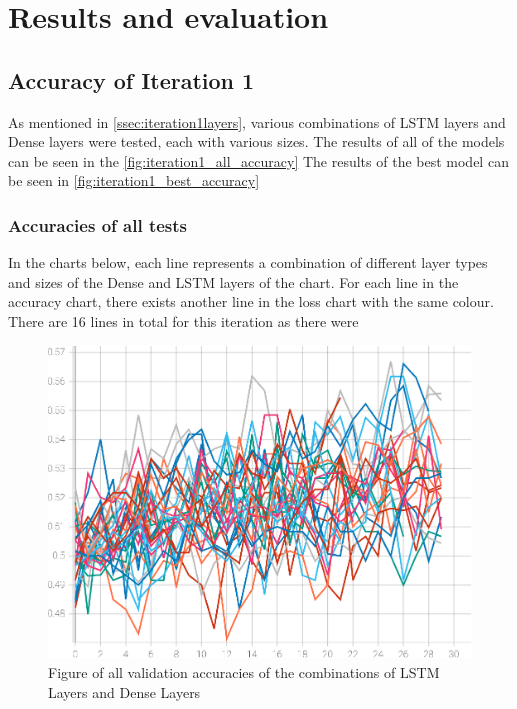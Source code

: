 \chapter{Results and evaluation} \label{chap:results}
\section{Accuracy of Iteration 1}
As mentioned in \autoref{ssec:iteration1layers}, various combinations of LSTM layers and Dense layers were tested,
each with various sizes. The results of all of the models can be seen in the \autoref{fig:iteration1_all_accuracy}
The results of the best model can be seen in \autoref{fig:iteration1_best_accuracy}

\subsection{Accuracies of all tests}
In the charts below, each line represents a combination of different layer types and sizes of the Dense and LSTM layers of the chart.
For each line in the accuracy chart, there exists another line in the loss chart with the same colour. There are 16 lines in total
for this iteration as there were 
\begin{figure}[ht]
    \centering
    \includegraphics[width=0.95\columnwidth]{figures/results/lstm_iteration1_all_accuracy.eps}
    \caption[Figure of accuracies and losses for Iteration 1]{Figure of all validation accuracies of the combinations of LSTM Layers and Dense Layers}
    \label{fig:iteration1_all_accuracy}
\end{figure}
\FloatBarrier
